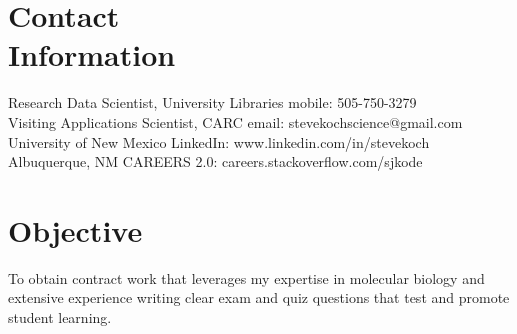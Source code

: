 \documentclass[margin,line]{resume}
\begin{document}
\begin{resume}

    \section{\mysidestyle Contact\\Information}

    Research Data Scientist, University Libraries                \hfill mobile: 505-750-3279          \vspace{0mm}\\\vspace{0mm}%
    Visiting Applications Scientist, CARC                                \hfill email: stevekochscience@gmail.com          \vspace{0mm}\\\vspace{0mm}%
    University of New Mexico                                         \hfill LinkedIn: www.linkedin.com/in/stevekoch  \vspace{0mm}\\\vspace{0mm}%
    Albuquerque, NM                                         \hfill CAREERS 2.0: careers.stackoverflow.com/sjkode  \vspace{0mm}\\\vspace{-4.5mm}%


    \section{\mysidestyle Objective}

    To obtain contract work that leverages my expertise in molecular biology and extensive experience writing clear exam and quiz questions that test and promote student learning.

%
%

\end{resume}
\end{document}
